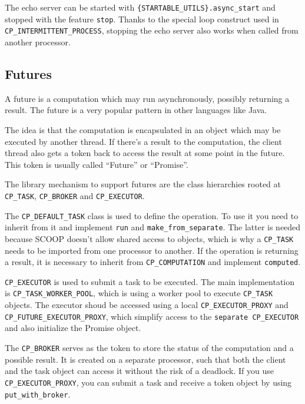 The echo server can be started with \lstinline!{STARTABLE_UTILS}.async_start! and stopped with the feature \lstinline!stop!.
Thanks to the special loop construct used in \lstinline!CP_INTERMITTENT_PROCESS!, stopping the echo server also works when called from another processor.

% 
% 

\subsection{Futures}

A future is a computation which may run asynchronously, possibly returning a result.
The future is a very popular pattern in other languages like Java.

The idea is that the computation is encapsulated in an object which may be executed by another thread.
If there's a result to the computation, the client thread also gets a token back to access the result at some point in the future.
This token is usually called ``Future'' or ``Promise''.

The library mechanism to support futures are the class hierarchies rooted at \lstinline!CP_TASK!, \lstinline!CP_BROKER! and \lstinline!CP_EXECUTOR!.

The \lstinline!CP_DEFAULT_TASK! class is used to define the operation.
To use it you need to inherit from it and implement \lstinline!run! and \lstinline!make_from_separate!.
The latter is needed because SCOOP doesn't allow shared access to objects, which is why a \lstinline!CP_TASK! needs to be imported from one processor to another.
If the operation is returning a result, it is necessary to inherit from \lstinline!CP_COMPUTATION! and implement \lstinline!computed!.

\lstinline!CP_EXECUTOR! is used to submit a task to be executed.
The main implementation is \lstinline!CP_TASK_WORKER_POOL!, which is using a worker pool to execute \lstinline!CP_TASK! objects.
The executor shoud be accessed using a local \lstinline!CP_EXECUTOR_PROXY! and \lstinline!CP_FUTURE_EXECUTOR_PROXY!, which simplify access to the \lstinline!separate CP_EXECUTOR! and also initialize the Promise object.

The \lstinline!CP_BROKER! serves as the token to store the status of the computation and a possible result.
It is created on a separate processor, such that both the client and the task object can access it without the risk of a deadlock.
If you use \lstinline!CP_EXECUTOR_PROXY!, you can submit a task and receive a token object by using \lstinline!put_with_broker!.

